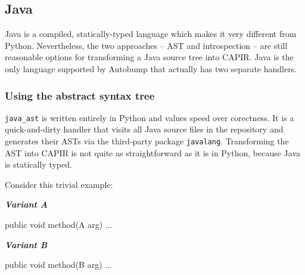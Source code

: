 \documentclass{l4proj}
\newenvironment{halfmini}[1]
{
\begin{minipage}[t]{0.5\textwidth}
\noindent\textbf{\textit{#1}}\\
}
{
\end{minipage}
}
\newcommand\genericstyle{\lstset{basicstyle=\ttm}}
\newcommand\codeinline[1]{{\genericstyle\lstinline!#1!}}
\begin{document}
\subsection{Java}
\label{JavaHandlers}

Java is a compiled, statically-typed language which makes it very
different from Python. Nevertheless, the two approaches -- AST
and introspection -- are still reasonable options for transforming a
Java source tree into CAPIR. Java is the only language supported by
Autobump that actually has two separate handlers.

\subsubsection{Using the abstract syntax tree}

\codeinline{java_ast} is written entirely in Python and
values speed over corectness. It is a quick-and-dirty handler that
visits all Java source files in the repository and generates their
ASTs via the third-party package \codeinline{javalang}\cite{Javalang}.
Transforming the AST into CAPIR is not quite as straightforward as it
is in Python, because Java is statically typed.

Consider this trivial example:

\begin{halfmini}{Variant A}
\begin{java}
public void method(A arg) { ... }
\end{java}
\end{halfmini}
\begin{halfmini}{Variant B}
\begin{java}
public void method(B arg) { ... }
\end{java}
\end{halfmini}
\end{document}
